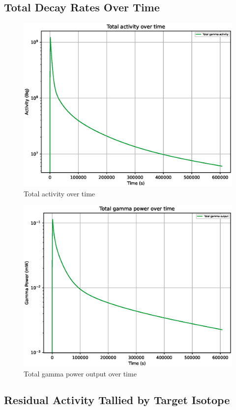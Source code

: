 \FloatBarrier
\clearpage

\subsection{Total Decay Rates Over Time}

\begin{figure}[htb]
\centering
\includegraphics[width=0.5\linewidth]{chapters/activity_code/mo-john-hewett/thick/totals/total_activity.eps}
\caption{Total activity over time}
\label{fig:mototalactivity}
\end{figure}

\begin{figure}[htb]
\centering
\includegraphics[width=0.5\linewidth]{chapters/activity_code/mo-john-hewett/thick/totals/total_gamma_power_mw.eps}
\caption{Total gamma power output over time}
\label{fig:mototalgammaoutput}
\end{figure}



\FloatBarrier
\clearpage

\subsection{Residual Activity Tallied by Target Isotope}

